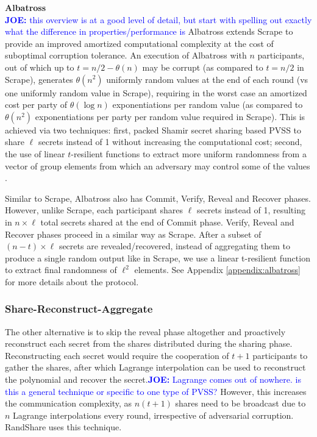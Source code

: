 \documentclass[letterpaper,twocolumn,10pt]{article}
\theoremstyle{definition}
\theoremstyle{remark}
\newcommand{\joenote}[1]{\textcolor{blue}{\textbf{JOE:} #1}}
\begin{document}
\textbf{Albatross}\\

\joenote{this overview is at a good level of detail, but start with spelling out exactly what the difference in properties/performance is}
Albatross extends Scrape to provide an improved amortized computational complexity at the cost of suboptimal corruption tolerance. An execution of Albatross with $n$ participants, out of which up to $t = n/2 - \theta(n)$ may be corrupt (as compared to $t = n/2$ in Scrape), generates $\theta(n^2)$ uniformly random values at the end of each round (vs one uniformly random value in Scrape), requiring in the worst case an amortized cost per party of $\theta(\log n)$ exponentiations per random value (as compared to $\theta(n^2)$ exponentiations per party per random value required in Scrape). This is achieved via two techniques: first, packed Shamir secret sharing based PVSS to share $\ell$ secrets instead of 1 without increasing the computational cost; second, the use of linear $t$-resilient functions to extract more uniform randomness from a vector of group elements from which an adversary may control some of the values . 

Similar to Scrape, Albatross also has Commit, Verify, Reveal and Recover phases. However, unlike Scrape, each participant shares $\ell$ secrets instead of 1, resulting in $n \times \ell$ total secrets shared at the end of Commit phase. Verify, Reveal and Recover phases proceed in a similar way as Scrape. After a subset of $(n-t) \times \ell$ secrets are revealed/recovered, instead of aggregating them to produce a single random output like in Scrape, we use a linear t-resilient function to extract final randomness of $\ell^2$ elements. See Appendix \ref{appendix:albatross} for more details about the protocol.\\

\subsubsection{Share-Reconstruct-Aggregate}
The other alternative is to skip the reveal phase altogether and proactively reconstruct each secret from the shares distributed during the sharing phase. Reconstructing each secret would require the cooperation of $t+1$ participants to gather the shares, after which Lagrange interpolation can be used to reconstruct the polynomial and recover the secret.\joenote{Lagrange comes out of nowhere. is this a general technique or specific to one type of PVSS?} However, this increases the communication complexity, as $n (t + 1)$ shares need to be broadcast due to $n$ Lagrange interpolations every round, irrespective of adversarial corruption. RandShare \cite{syta2017scalable} uses this technique.\\
\end{document}
